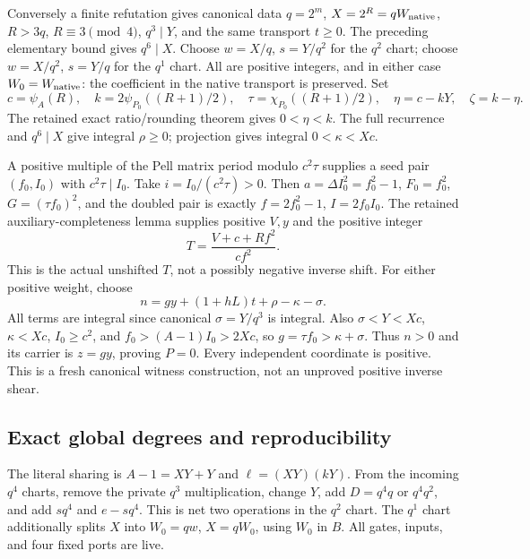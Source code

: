 Conversely a finite refutation gives canonical data $q=2^m$, $X=2^R=qW_{\rm native}$,
$R>3q$, $R\equiv3\pmod4$, $q^3\mid Y$, and the same transport $t\ge0$.
The preceding elementary bound gives $q^6\mid X$.
Choose $w=X/q$, $s=Y/q^2$ for the $q^2$ chart; choose $w=X/q^2$, $s=Y/q$
for the $q^1$ chart. All are positive integers, and in either case
$W_0=W_{\rm native}$: the coefficient in the native transport is preserved.
Set
\[
 c=\psi_A(R),\quad k=2\psi_{P_0}((R+1)/2),\quad
 \tau=\chi_{P_0}((R+1)/2),\quad
 \eta=c-kY,\quad\zeta=k-\eta.
\]
The retained exact ratio/rounding theorem gives $0<\eta<k$.
The full recurrence and $q^6\mid X$ give integral $\rho\ge0$;
projection gives integral $0<\kappa<Xc$.

A positive multiple of the Pell matrix period modulo $c^2\tau$ supplies a
seed pair $(f_0,I_0)$ with $c^2\tau\mid I_0$. Take $i=I_0/(c^2\tau)>0$.
Then $a=\Delta I_0^2=f_0^2-1$, $F_0=f_0^2$, $G=(\tau f_0)^2$, and the
doubled pair is exactly $f=2f_0^2-1$, $I=2f_0I_0$.
The retained auxiliary-completeness lemma supplies positive $V,y$ and the
positive integer
\[
 T=\frac{V+c+Rf^2}{cf^2}.
\]
This is the actual unshifted $T$, not a possibly negative inverse shift.
For either positive weight, choose
\[
 n=gy+(1+hL)t+\rho-\kappa-\sigma.
\]
All terms are integral since canonical $\sigma=Y/q^3$ is integral.
Also $\sigma<Y<Xc$, $\kappa<Xc$, $I_0\ge c^2$, and
$f_0>(A-1)I_0>2Xc$, so $g=\tau f_0>\kappa+\sigma$.
Thus $n>0$ and its carrier is $z=gy$, proving $P=0$.
Every independent coordinate is positive. This is a fresh canonical witness
construction, not an unproved positive inverse shear.

\subsection{Exact global degrees and reproducibility}
The literal sharing is $A-1=XY+Y$ and $\ell=(XY)(kY)$.
From the incoming $q^4$ charts, remove the private $q^3$ multiplication,
change $Y$, add $D=q^4q$ or $q^4q^2$, and add $sq^4$ and $e-sq^4$.
This is net two operations in the $q^2$ chart. The $q^1$ chart additionally
splits $X$ into $W_0=qw$, $X=qW_0$, using $W_0$ in $B$.
All gates, inputs, and four fixed ports are live.


